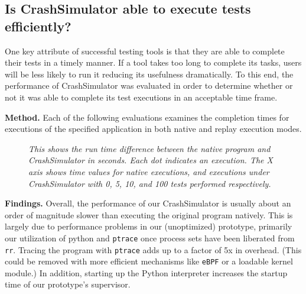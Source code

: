 \subsection{Is CrashSimulator able to execute tests efficiently?}
\label{sec-perf}


One key attribute of successful testing tools is that they are able to
complete their tests in a timely manner.  If a tool takes too long to
complete its tasks, users will be less likely to run it reducing its
usefulness dramatically. To this end, the performance of CrashSimulator was
evaluated in order to determine whether or not it was able to complete its
test executions in an acceptable time frame.

{\bf Method.} Each of the following evaluations examines the completion
times for executions of the specified application in both
native and replay execution modes.


    \begin{figure}[t]
        \center{}
        \caption{\emph{This shows the run time difference between the
native program and CrashSimulator in seconds.  Each dot indicates an
        execution.  The X axis shows time values for native executions, and
        executions under CrashSimulator with 0, 5, 10, and 100 tests
        performed respectively.
}}
         \label{figure:performance}

    \end{figure}


{\bf Findings.} Overall, the performance of our CrashSimulator is usually
about an order of magnitude slower than executing the original program
natively.  This is largely due to performance problems in our (unoptimized)
prototype, primarily our utilization of python and {\tt ptrace} once
process sets have been liberated from {\tt rr}.  Tracing the program
with {\tt ptrace} adds up to a factor of 5x in overhead.  (This could be
removed with more efficient mechanisms like {\tt eBPF} or a loadable kernel
module.)  In addition, starting up the Python interpreter increases the
startup time of our prototype's supervisor.

